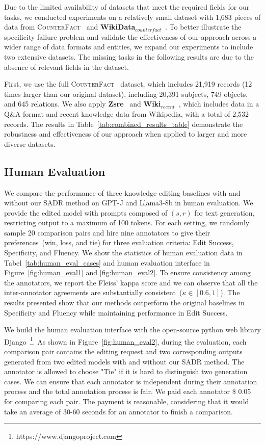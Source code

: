 Due to the limited availability of datasets that meet the required fields for our tasks, we conducted experiments on a relatively small dataset with 1,683 pieces of data from \textsc{CounterFact}~\citep{rome} and \textbf{WikiData}$_{counterfact}$~\citep{yao2023editing}. 
To better illustrate the specificity failure problem and validate the effectiveness of our approach across a wider range of data formats and entities, we expand our experiments to include two extensive datasets. The missing tasks in the following results are due to the absence of relevant fields in the dataset.

First, we use the full \textsc{CounterFact}~\citep{rome} dataset, which includes 21,919 records (12 times larger than our original dataset), including 20,391 subjects, 749 objects, and 645 relations.
We also apply \textbf{Zsre}~\citep{rome} and \textbf{Wiki}$_{recent}$~\citep{yao2023editing},  which includes data in a Q\&A format and recent knowledge data from Wikipedia, with a total of 2,532 records. 
The results in Table~\ref{tab:combined_results_table} demonstrate the robustness and effectiveness of our approach when applied to larger and more diverse datasets.



\subsection{Human Evaluation}
\label{app:human_eval}

We compare the performance of three knowledge editing baselines with and without our SADR method on GPT-J and Llama3-8b in human evaluation.
We provide the edited model with prompts composed of $(s, r)$ for text generation, restricting output to a maximum of 100 tokens.
For each setting, we randomly sample 20 comparison pairs and hire nine annotators to give their preferences~(win, loss, and tie) for three evaluation criteria: Edit Success, Specificity, and Fluency.
We show the statistics of human evaluation data in Tabel~\ref{tab:human_eval_cases} and human evaluation interface in Figure~\ref{fig:human_eval1} and \ref{fig:human_eval2}.
To ensure consistency among the annotators, we report the Fleiss’ kappa score and we can observe that all the inter-annotator agreements are substantially consistent~($\kappa\in[0.6,1]$).
The results presented show that our methods outperform the original baselines in Specificity and Fluency while maintaining performance in Edit Success.

We build the human evaluation interface with the open-source python web library Django~\footnote{https://www.djangoproject.com}.
As shown in Figure~\ref{fig:human_eval2}, during the evaluation, each comparison pair contains the editing request and two corresponding outputs generated from two edited models with and without our SADR method.
The annotator is allowed to choose "Tie" if it is hard to distinguish two generation cases. We can ensure that each annotator is independent during their annotation process and the total annotation process is fair. We paid each annotator \$ 0.05 for comparing each pair. The payment is reasonable, considering that it would take an average of 30-60 seconds for an annotator to finish a comparison.


